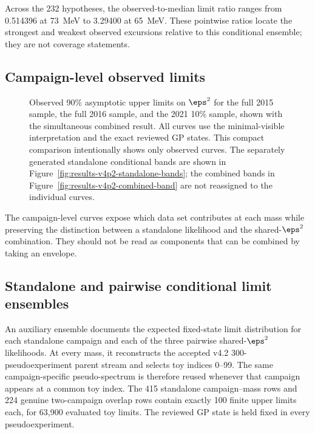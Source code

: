 Across the 232 hypotheses, the observed-to-median limit ratio ranges from
0.514396 at 73~MeV to 3.29400 at 65~MeV. These pointwise ratios locate the
strongest and weakest observed excursions relative to this conditional ensemble;
they are not coverage statements.

\subsection{Campaign-level observed limits}
\label{sec:results-v4p2-individual-limits}

\begin{figure}[H]
\centering
{}
\caption{Observed 90\% asymptotic \CLs{} upper limits on $\eps^2$ for the full
2015 sample, the full 2016 sample, and the 2021 10\% sample, shown with the
simultaneous combined result. All curves use the minimal-visible interpretation
and the exact reviewed GP states. This compact comparison intentionally shows
only observed curves. The separately generated standalone conditional bands
are shown in Figure~\ref{fig:results-v4p2-standalone-bands}; the combined bands
in Figure~\ref{fig:results-v4p2-combined-band} are not reassigned to the
individual curves.}
\label{fig:results-v4p2-individual-limits}
\end{figure}

The campaign-level curves expose which data set contributes at each mass while
preserving the distinction between a standalone likelihood and the shared-$\eps^2$
combination. They should not be read as components that can be combined by taking
an envelope.

\subsection{Standalone and pairwise conditional limit ensembles}
\label{sec:results-v4p2-standalone-pairwise-bands}

An auxiliary ensemble documents the expected fixed-state limit distribution for
each standalone campaign and each of the three pairwise shared-$\eps^2$
likelihoods. At every mass, it reconstructs the accepted v4.2
300-pseudoexperiment parent stream and selects toy indices 0--99. The same
campaign-specific pseudo-spectrum is therefore reused whenever that campaign
appears at a common toy index. The 415 standalone campaign--mass rows and 224
genuine two-campaign overlap rows contain exactly 100 finite upper limits each,
for 63,900 evaluated toy limits. The reviewed GP state is held fixed in every
pseudoexperiment.

